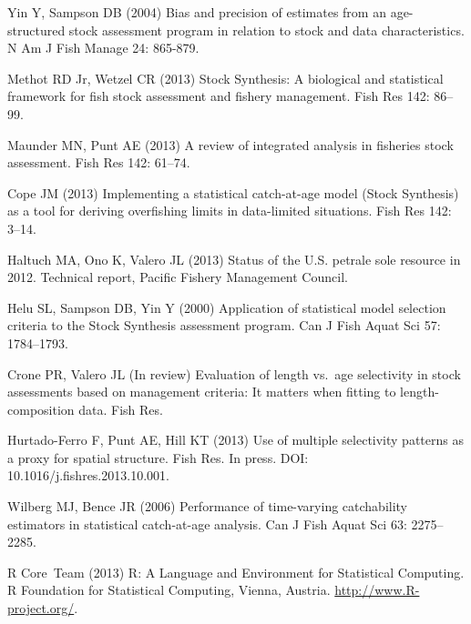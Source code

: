 \begin{thebibliography}{10}
Yin Y, Sampson DB (2004) Bias and precision of estimates from an age-structured
  stock assessment program in relation to stock and data characteristics.
\newblock N Am J Fish Manage 24: 865-879.

Methot RD Jr, Wetzel CR (2013) {Stock Synthesis}: A biological and statistical
  framework for fish stock assessment and fishery management.
\newblock Fish Res 142: 86--99.

Maunder MN, Punt AE (2013) A review of integrated analysis in fisheries stock
  assessment.
\newblock Fish Res 142: 61--74.

Cope JM (2013) Implementing a statistical catch-at-age model ({Stock
  Synthesis}) as a tool for deriving overfishing limits in data-limited
  situations.
\newblock Fish Res 142: 3--14.

Haltuch MA, Ono K, Valero JL (2013) Status of the {U.S.} petrale sole resource
  in 2012.
\newblock Technical report, Pacific Fishery Management Council.

Helu SL, Sampson DB, Yin Y (2000) Application of statistical model selection
  criteria to the {Stock Synthesis} assessment program.
\newblock Can J Fish Aquat Sci 57: 1784--1793.

Crone PR, Valero JL (In review) Evaluation of length vs.~age selectivity in
  stock assessments based on management criteria: It matters when fitting to
  length-composition data.
\newblock Fish Res.

Hurtado-Ferro F, Punt AE, Hill KT (2013) Use of multiple selectivity patterns
  as a proxy for spatial structure.
\newblock Fish Res. In press. DOI: 10.1016/j.fishres.2013.10.001.

Wilberg MJ, Bence JR (2006) Performance of time-varying catchability estimators
  in statistical catch-at-age analysis.
\newblock Can J Fish Aquat Sci 63: 2275--2285.

\textsf{R} Core~Team (2013) \textsf{R}: A Language and Environment for
  Statistical Computing.
\newblock \textsf{R} Foundation for Statistical Computing, Vienna, Austria.
\newblock \urlprefix\url{http://www.R-project.org/}.


\end{thebibliography}
